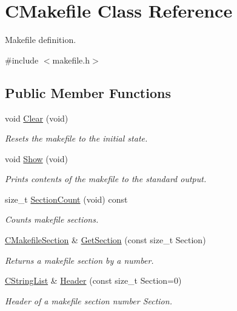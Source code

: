 \hypertarget{classCMakefile}{\section{C\-Makefile Class Reference}
\label{classCMakefile}
}


Makefile definition.  




{\ttfamily \#include $<$makefile.\-h$>$}

\subsection*{Public Member Functions}
\begin{DoxyCompactItemize}
\item 
void \hyperlink{classCMakefile_a85fac8d19f17693fb9496370f77f2e75}{Clear} (void)
\begin{DoxyCompactList}\small\item\em Resets the makefile to the initial state. \end{DoxyCompactList}\item 
void \hyperlink{classCMakefile_ad57cbe3e10deb62aa2d0ce72c9cdc2e6}{Show} (void)
\begin{DoxyCompactList}\small\item\em Prints contents of the makefile to the standard output. \end{DoxyCompactList}\item 
size\-\_\-t \hyperlink{classCMakefile_a197e30d4be127ed7c48514dc81ac8a2f}{Section\-Count} (void) const 
\begin{DoxyCompactList}\small\item\em Counts makefile sections. \end{DoxyCompactList}\item 
\hyperlink{classCMakefileSection}{C\-Makefile\-Section} \& \hyperlink{classCMakefile_aa5c9b7b335a3fec333f45acab20fe8a8}{Get\-Section} (const size\-\_\-t Section)
\begin{DoxyCompactList}\small\item\em Returns a makefile section by a number. \end{DoxyCompactList}\item 
\hyperlink{classCStringList}{C\-String\-List} \& \hyperlink{classCMakefile_a1b850cb1fd1d655282b6be5652fd1090}{Header} (const size\-\_\-t Section=0)
\begin{DoxyCompactList}\small\item\em Header of a makefile section number {\itshape Section}. \end{DoxyCompactList}\item 

\end{DoxyCompactItemize}
